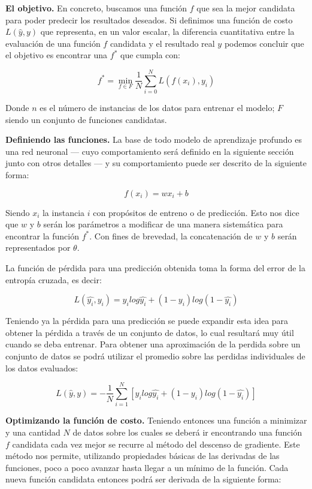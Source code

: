\textbf{El objetivo.} En concreto, buscamos una función $f$ que sea la mejor candidata para poder predecir los resultados deseados. Si definimos una función de costo $L(\hat{y}, y)$ que representa, en un valor escalar, la diferencia cuantitativa entre la evaluación de una función $f$ candidata y el resultado real $y$ podemos concluir que el objetivo es encontrar una $f^*$ que cumpla con:

$$f^* = \min_{f \in F} \frac{1}{N} \sum_{i = 0}^{N} L(f(x_i), y_i)$$

Donde $n$ es el número de instancias de los datos para entrenar el modelo; $F$ siendo un conjunto de funciones candidatas.

\textbf{Definiendo las funciones.} La base de todo modelo de aprendizaje profundo es una red neuronal --- cuyo comportamiento será definido en la siguiente sección junto con otros detalles --- y su comportamiento puede ser descrito de la siguiente forma:

$$ f(x_i) = w x_i + b $$

Siendo $x_i$ la instancia $i$ con propósitos de entreno o de predicción. Esto nos dice que $w$ y $b$ serán los parámetros a modificar de una manera sistemática para encontrar la función $f^*$. Con fines de brevedad, la concatenación de $w$ y $b$ serán representados por $\theta$.

La función de pérdida para una predicción obtenida toma la forma del error de la entropía cruzada, es decir:

$$ L(\hat{y_i}, y_i) = y_i log\hat{y_i} + (1 - y_i)log(1 - \hat{y_i}) $$

Teniendo ya la pérdida para una predicción se puede expandir esta idea para obtener la pérdida a través de un conjunto de datos, lo cual resultará muy útil cuando se deba entrenar. Para obtener una aproximación de la perdida sobre un conjunto de datos se podrá utilizar el promedio sobre las perdidas individuales de los datos evaluados:

$$ L(\hat{y}, y) = - \frac{1}{N} \sum_{i = 1}^{N} [y_i log\hat{y_i} + (1 - y_i)log(1 - \hat{y_i})] $$

\textbf{Optimizando la función de costo.} Teniendo entonces una función a minimizar y una cantidad $N$ de datos sobre los cuales se deberá ir encontrando una función $f$ candidata cada vez mejor se recurre al método del descenso de gradiente. Este método nos permite, utilizando propiedades básicas de las derivadas de las funciones, poco a poco avanzar hasta llegar a un mínimo de la función. Cada nueva función candidata entonces podrá ser derivada de la siguiente forma:

